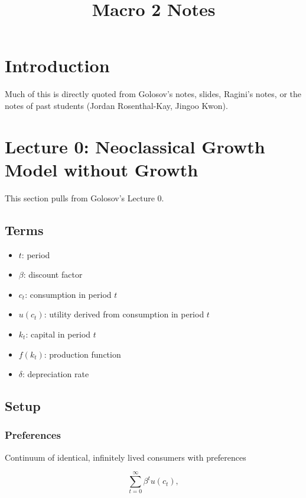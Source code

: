 \documentclass[10pt]{article}
\title{Macro 2 Notes}
\author{}
\date{}
\begin{document}
\maketitle

\tableofcontents

\section{Introduction}

Much of this is directly quoted from Golosov's notes, slides, Ragini's notes,
or the notes of past students (Jordan Rosenthal-Kay, Jingoo Kwon).

\section{Lecture 0: Neoclassical Growth Model without Growth}

This section pulls from Golosov's Lecture 0.

\subsection{Terms}

\begin{itemize}
    \item $t$: period
    \item $\beta$: discount factor
    \item $c_t$: consumption in period $t$
    \item $u(c_t)$: utility derived from consumption in period $t$
    \item $k_t$: capital in period $t$
    \item $f(k_t)$: production function
    \item $\delta$: depreciation rate
\end{itemize}

\subsection{Setup}

\subsubsection{Preferences}

Continuum of identical, infinitely lived consumers with preferences

$$
\sum_{t=0}^{\infty} \beta^t u\left(c_t\right),
$$
\end{document}
